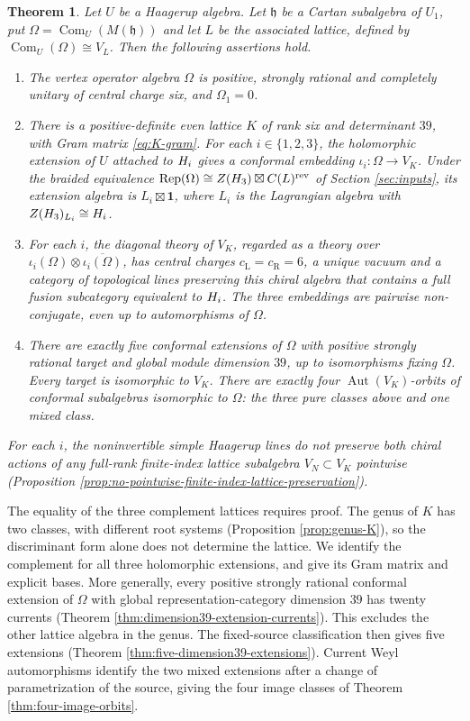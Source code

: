 \documentclass[leqno]{article}
\let\cal\relax
\newcommand{\cal}{\mathcal}
\newcommand{\co}{\colon}
\newcommand{\ot}{\otimes}
\DeclareMathOperator{\Rep}{Rep}
\newtheorem{thm}{Theorem}[section]
\numberwithin{equation}{section}
\begin{document}
\begin{thm}
\label{thm:main-six}
Let $U$ be a Haagerup algebra. Let $\mathfrak h$ be a Cartan subalgebra of $U_1$, put $\Omega = \operatorname{Com}_U(M(\mathfrak h))$ and let $L$ be the associated lattice, defined by $\operatorname{Com}_U(\Omega) \cong V_L$. Then the following assertions hold.
\begin{enumerate}
\item The vertex operator algebra $\Omega$ is positive, strongly rational and completely unitary of central charge six, and $\Omega_1 = 0$.
\item There is a positive-definite even lattice $K$ of rank six and determinant $39$, with Gram matrix \eqref{eq:K-gram}. For each $i \in \{1,2,3\}$, the holomorphic extension of $U$ attached to $\cal H_i$ gives a conformal embedding $\iota_i \co \Omega \to V_K$. Under the braided equivalence $\Rep(\Omega) \cong Z(\cal H_3)\boxtimes\cal C(L)^{\mathrm{rev}}$ of Section \ref{sec:inputs}, its extension algebra is $L_i\boxtimes\mathbf1$, where $L_i$ is the Lagrangian algebra with $Z(\cal H_3)_{L_i} \cong \cal H_i$.
\item For each $i$, the diagonal theory of $V_K$, regarded as a theory over $\iota_i(\Omega)\ot\overline{\iota_i(\Omega)}$, has central charges $c_{\mathrm L} = c_{\mathrm R} = 6$, a unique vacuum and a category of topological lines preserving this chiral algebra that contains a full fusion subcategory equivalent to $\cal H_i$. The three embeddings are pairwise non-conjugate, even up to automorphisms of $\Omega$.
\item There are exactly five conformal extensions of $\Omega$ with positive strongly rational target and global module dimension $39$, up to isomorphisms fixing $\Omega$. Every target is isomorphic to $V_K$. There are exactly four $\operatorname{Aut}(V_K)$-orbits of conformal subalgebras isomorphic to $\Omega$: the three pure classes above and one mixed class.
\end{enumerate}
For each $i$, the noninvertible simple Haagerup lines do not preserve both chiral actions of any full-rank finite-index lattice subalgebra $V_N \subset V_K$ pointwise (Proposition \ref{prop:no-pointwise-finite-index-lattice-preservation}).
\end{thm}

The equality of the three complement lattices requires proof. The genus of $K$ has two classes, with different root systems (Proposition \ref{prop:genus-K}), so the discriminant form alone does not determine the lattice. We identify the complement for all three holomorphic extensions, and give its Gram matrix and explicit bases. More generally, every positive strongly rational conformal extension of $\Omega$ with global representation-category dimension $39$ has twenty currents (Theorem \ref{thm:dimension39-extension-currents}). This excludes the other lattice algebra in the genus. The fixed-source classification then gives five extensions (Theorem \ref{thm:five-dimension39-extensions}). Current Weyl automorphisms identify the two mixed extensions after a change of parametrization of the source, giving the four image classes of Theorem \ref{thm:four-image-orbits}.
\end{document}
